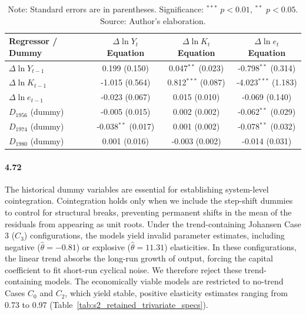 \begin{table}[H]
\centering
\caption{Focal VECM Short-Run Dynamics and Dummies}
\label{tab:s2_short_run_dynamics}
\footnotesize
\begin{tabular}{lccc}
\toprule
Regressor / Dummy & $\Delta \ln Y_t$ Equation & $\Delta \ln K_t$ Equation & $\Delta \ln e_t$ Equation \\
\midrule
\midrule
$\Delta \ln Y_{t-1}$ & 0.199 (0.150) & 0.047$^{**}$ (0.023) & -0.798$^{**}$ (0.314) \\
$\Delta \ln K_{t-1}$ & -1.015 (0.564) & 0.812$^{***}$ (0.087) & -4.023$^{***}$ (1.183) \\
$\Delta \ln e_{t-1}$ & -0.023 (0.067) & 0.015 (0.010) & -0.069 (0.140) \\
\midrule
$D_{1956}$ (dummy) & -0.005 (0.015) & 0.002 (0.002) & -0.062$^{**}$ (0.029) \\
$D_{1974}$ (dummy) & -0.038$^{**}$ (0.017) & 0.001 (0.002) & -0.078$^{**}$ (0.032) \\
$D_{1980}$ (dummy) & 0.001 (0.016) & -0.003 (0.002) & -0.014 (0.031) \\
\bottomrule
\end{tabular}
\caption*{\footnotesize Note: Standard errors are in parentheses. Significance: $^{***}$ $p<0.01$, $^{**}$ $p<0.05$. Source: Author's elaboration.}
\end{table}

\paragraph{4.72}
The historical dummy variables are essential for establishing system-level cointegration. Cointegration holds only when we include the step-shift dummies to control for structural breaks, preventing permanent shifts in the mean of the residuals from appearing as unit roots. Under the trend-containing Johansen Case 3 ($C_3$) configurations, the models yield invalid parameter estimates, including negative ($\hat{\theta} = -0.81$) or explosive ($\hat{\theta} = 11.31$) elasticities. In these configurations, the linear trend absorbs the long-run growth of output, forcing the capital coefficient to fit short-run cyclical noise. We therefore reject these trend-containing models. The economically viable models are restricted to no-trend Cases $C_0$ and $C_2$, which yield stable, positive elasticity estimates ranging from 0.73 to 0.97 (Table~\ref{tab:s2_retained_trivariate_specs}).

